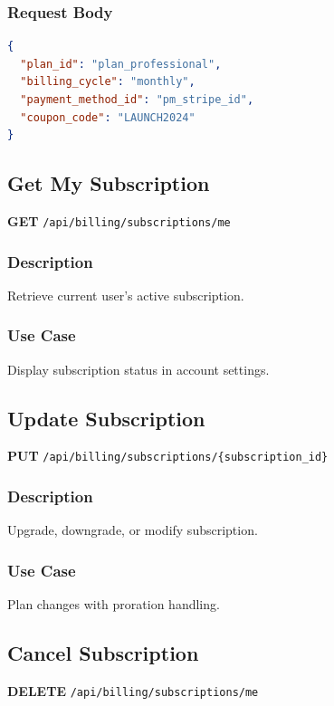 \documentclass[11pt,a4paper]{report}
\begin{document}
\subsubsection{Request Body}
\begin{lstlisting}[style=jsoncode,language=json]
{
  "plan_id": "plan_professional",
  "billing_cycle": "monthly",
  "payment_method_id": "pm_stripe_id",
  "coupon_code": "LAUNCH2024"
}
\end{lstlisting}

\subsection{Get My Subscription}

\textbf{GET} \texttt{/api/billing/subscriptions/me}

\subsubsection{Description}
Retrieve current user's active subscription.

\subsubsection{Use Case}
Display subscription status in account settings.

\subsection{Update Subscription}

\textbf{PUT} \texttt{/api/billing/subscriptions/\{subscription\_id\}}

\subsubsection{Description}
Upgrade, downgrade, or modify subscription.

\subsubsection{Use Case}
Plan changes with proration handling.

\subsection{Cancel Subscription}

\textbf{DELETE} \texttt{/api/billing/subscriptions/me}
\end{document}
